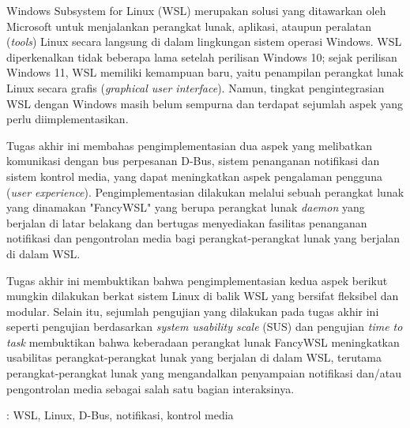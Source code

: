 Windows Subsystem for Linux (WSL) merupakan solusi yang ditawarkan oleh Microsoft untuk menjalankan perangkat lunak, aplikasi, ataupun peralatan (\textit{tools}) Linux secara langsung di dalam lingkungan sistem operasi Windows. WSL diperkenalkan tidak beberapa lama setelah perilisan Windows 10; sejak perilisan Windows 11, WSL memiliki kemampuan baru, yaitu penampilan perangkat lunak Linux secara grafis (\textit{graphical user interface}). Namun, tingkat pengintegrasian WSL dengan Windows masih belum sempurna dan terdapat sejumlah aspek yang perlu diimplementasikan.

Tugas akhir ini membahas pengimplementasian dua aspek yang melibatkan komunikasi dengan bus perpesanan D-Bus, sistem penanganan notifikasi dan sistem kontrol media, yang dapat meningkatkan aspek pengalaman pengguna (\textit{user experience}). Pengimplementasian dilakukan melalui sebuah perangkat lunak yang dinamakan "FancyWSL" yang berupa perangkat lunak \textit{daemon} yang berjalan di latar belakang dan bertugas menyediakan fasilitas penanganan notifikasi dan pengontrolan media bagi perangkat-perangkat lunak yang berjalan di dalam WSL.

Tugas akhir ini membuktikan bahwa pengimplementasian kedua aspek berikut mungkin dilakukan berkat sistem Linux di balik WSL yang bersifat fleksibel dan modular. Selain itu, sejumlah pengujian yang dilakukan pada tugas akhir ini seperti pengujian berdasarkan \textit{system usability scale} (SUS) dan pengujian \textit{time to task} membuktikan bahwa keberadaan perangkat lunak FancyWSL meningkatkan usabilitas perangkat-perangkat lunak yang berjalan di dalam WSL, terutama perangkat-perangkat lunak yang mengandalkan penyampaian notifikasi dan/atau pengontrolan media sebagai salah satu bagian interaksinya.

 : WSL, Linux, D-Bus, notifikasi, kontrol media
